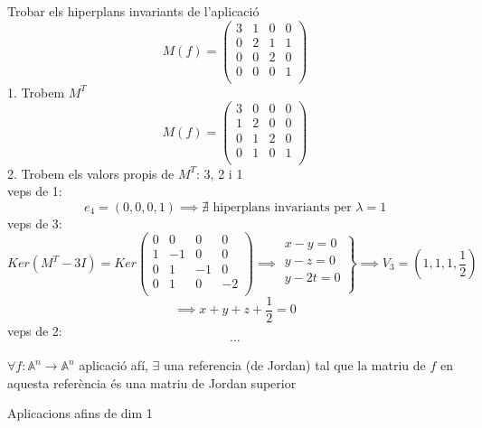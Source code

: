 \begin{exmp}
	Trobar els hiperplans invariants de l'aplicació
	\[M(f)=\left(\begin{array}{ccc|c}3&1&0&0\\0&2&1&1\\0&0&2&0\\\hline 0&0&0&1\\\end{array}\right)\]
	1. Trobem $M^T$
	\[M(f)=\left(\begin{array}{ccc|c}3&0&0&0\\1&2&0&0\\0&1&2&0\\\hline 0&1&0&1\\\end{array}\right)\]
	2. Trobem els valors propis de $M^T$: 3, 2 i 1\\
	veps de 1: \\
	\[e_4=(0,0,0,1)\implies\nexists\text{ hiperplans invariants per }\lambda=1\]
	veps de 3: \\
	\[Ker(M^T-3I)=Ker\left(\begin{array}{ccc|c}0&0&0&0\\1&-1&0&0\\0&1&-1&0\\\hline 0&1&0&-2\\\end{array}\right)\implies\left.\begin{array}{r}x-y=0\\y-z=0\\y-2t=0\\\end{array}\right\}\implies V_3=(1,1,1,\frac{1}{2})\]
	\[\implies x+y+z+\frac{1}{2}=0\]
	veps de 2: \\
	\[\cdots\]
\end{exmp}

\begin{prop}
	$\forall f:\mathbb{A}^n\to\mathbb{A}^n$ aplicació afí, $\exists$ una referencia (de Jordan) tal que la matriu de $f$ en aquesta referència és una matriu de Jordan superior
\end{prop}

Aplicacions afins de dim 1

